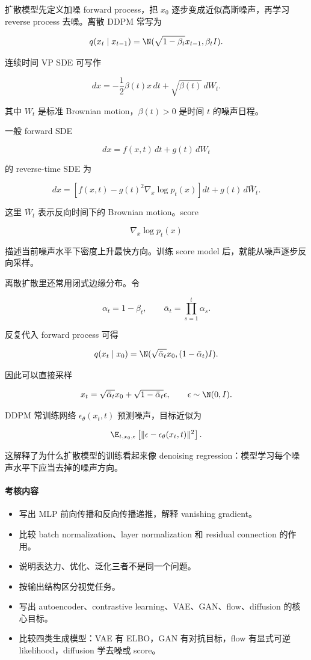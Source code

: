 
扩散模型先定义加噪 forward process，把 \(x_0\) 逐步变成近似高斯噪声，再学习 reverse process 去噪。离散 DDPM 常写为

\[
  q(x_t\mid x_{t-1})
  =
  \N(\sqrt{1-\beta_t}x_{t-1},\beta_t I).
\]

连续时间 VP SDE 可写作

\[
  dx=-\frac12\beta(t)x\,dt+\sqrt{\beta(t)}\,dW_t.
\]

其中 \(W_t\) 是标准 Brownian motion，\(\beta(t)>0\) 是时间 \(t\) 的噪声日程。

一般 forward SDE

\[
  dx=f(x,t)\,dt+g(t)\,dW_t
\]

的 reverse-time SDE 为

\[
  dx=
  \left[
    f(x,t)-g(t)^2\nabla_x\log p_t(x)
  \right]dt
  +
  g(t)\,d\bar W_t.
\]

这里 \(\bar W_t\) 表示反向时间下的 Brownian motion。score

\[
  \nabla_x\log p_t(x)
\]

描述当前噪声水平下密度上升最快方向。训练 score model 后，就能从噪声逐步反向采样。

离散扩散里还常用闭式边缘分布。令

\[
  \alpha_t=1-\beta_t,
  \qquad
  \bar\alpha_t=\prod_{s=1}^{t}\alpha_s.
\]

反复代入 forward process 可得

\[
  q(x_t\mid x_0)
  =
  \N(\sqrt{\bar\alpha_t}x_0,(1-\bar\alpha_t)I).
\]

因此可以直接采样

\[
  x_t
  =
  \sqrt{\bar\alpha_t}x_0
  +
  \sqrt{1-\bar\alpha_t}\epsilon,
  \qquad
  \epsilon\sim\N(0,I).
\]

DDPM 常训练网络 \(\epsilon_\theta(x_t,t)\) 预测噪声，目标近似为

\[
  \E_{t,x_0,\epsilon}
  \left[
    \|\epsilon-\epsilon_\theta(x_t,t)\|^2
  \right].
\]

这解释了为什么扩散模型的训练看起来像 denoising regression：模型学习每个噪声水平下应当去掉的噪声方向。

\paragraph{考核内容}

\begin{itemize}
  \item 写出 MLP 前向传播和反向传播递推，解释 vanishing gradient。
  \item 比较 batch normalization、layer normalization 和 residual connection 的作用。
  \item 说明表达力、优化、泛化三者不是同一个问题。
  \item 按输出结构区分视觉任务。
  \item 写出 autoencoder、contrastive learning、VAE、GAN、flow、diffusion 的核心目标。
  \item 比较四类生成模型：VAE 有 ELBO，GAN 有对抗目标，flow 有显式可逆 likelihood，diffusion 学去噪或 score。
\end{itemize}

